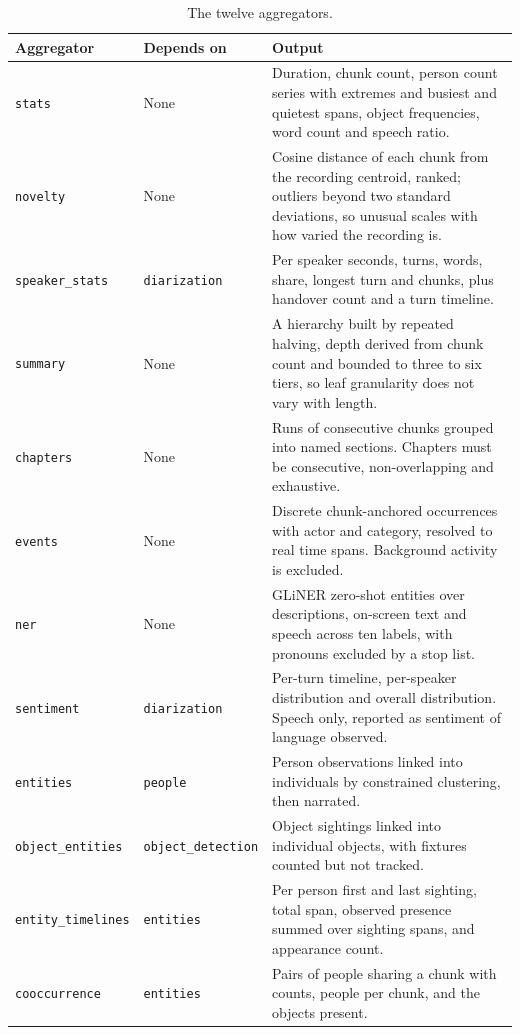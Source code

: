 \documentclass[11pt,a4paper]{article}
\begin{document}
\begin{table}[htbp]
\centering
\small
\begin{tabularx}{\textwidth}{@{}L{2.2cm}L{2.4cm}X@{}}
\toprule
\textbf{Aggregator} & \textbf{Depends on} & \textbf{Output} \\
\midrule
\texttt{stats} & None & Duration, chunk count, person count series with extremes and busiest and quietest spans, object frequencies, word count and speech ratio. \\
\texttt{novelty} & None & Cosine distance of each chunk from the recording centroid, ranked; outliers beyond two standard deviations, so unusual scales with how varied the recording is. \\
\texttt{speaker\_stats} & \texttt{diarization} & Per speaker seconds, turns, words, share, longest turn and chunks, plus handover count and a turn timeline. \\
\texttt{summary} & None & A hierarchy built by repeated halving, depth derived from chunk count and bounded to three to six tiers, so leaf granularity does not vary with length. \\
\texttt{chapters} & None & Runs of consecutive chunks grouped into named sections. Chapters must be consecutive, non-overlapping and exhaustive. \\
\texttt{events} & None & Discrete chunk-anchored occurrences with actor and category, resolved to real time spans. Background activity is excluded. \\
\texttt{ner} & None & GLiNER zero-shot entities over descriptions, on-screen text and speech across ten labels, with pronouns excluded by a stop list. \\
\texttt{sentiment} & \texttt{diarization} & Per-turn timeline, per-speaker distribution and overall distribution. Speech only, reported as sentiment of language observed. \\
\texttt{entities} & \texttt{people} & Person observations linked into individuals by constrained clustering, then narrated. \\
\texttt{object\_entities} & \texttt{object\_detection} & Object sightings linked into individual objects, with fixtures counted but not tracked. \\
\texttt{entity\_timelines} & \texttt{entities} & Per person first and last sighting, total span, observed presence summed over sighting spans, and appearance count. \\
\texttt{cooccurrence} & \texttt{entities} & Pairs of people sharing a chunk with counts, people per chunk, and the objects present. \\
\bottomrule
\end{tabularx}
\caption{The twelve aggregators.}
\end{table}
\end{document}
